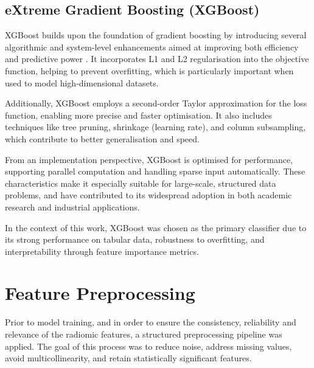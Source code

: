 \documentclass[12pt, a4paper]{report}
\begin{document}
\subsection{eXtreme Gradient Boosting (XGBoost)}

XGBoost builds upon the foundation of gradient boosting by introducing several algorithmic and system-level enhancements aimed at improving both efficiency and predictive power \cite{Chen2016}. It incorporates L1 and L2 regularisation into the objective function, helping to prevent overfitting, which is particularly important when used to model high-dimensional datasets.

Additionally, XGBoost employs a second-order Taylor approximation for the loss function, enabling more precise and faster optimisation. It also includes techniques like tree pruning, shrinkage (learning rate), and column subsampling, which contribute to better generalisation and speed.

From an implementation perspective, XGBoost is optimised for performance, supporting parallel computation and handling sparse input automatically. These characteristics make it especially suitable for large-scale, structured data problems, and have contributed to its widespread adoption in both academic research and industrial applications.

In the context of this work, XGBoost was chosen as the primary classifier due to its strong performance on tabular data, robustness to overfitting, and interpretability through feature importance metrics.

\section{Feature Preprocessing}

Prior to model training, and in order to ensure the consistency, reliability and relevance of the radiomic features, a structured preprocessing pipeline was applied. The goal of this process was to reduce noise, address missing values, avoid multicollinearity, and retain statistically significant features.
\end{document}
